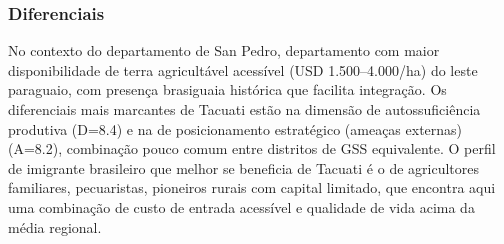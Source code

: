 \subsubsection*{Diferenciais}\label{dif-tacuati-0210}
No contexto do departamento de San Pedro, departamento com maior disponibilidade de terra agricultável acessível (USD 1.500–4.000/ha) do leste paraguaio, com presença brasiguaia histórica que facilita integração. Os diferenciais mais marcantes de Tacuati estão na dimensão de autossuficiência produtiva (D=8.4) e na de posicionamento estratégico (ameaças externas) (A=8.2), combinação pouco comum entre distritos de GSS equivalente. O perfil de imigrante brasileiro que melhor se beneficia de Tacuati é o de agricultores familiares, pecuaristas, pioneiros rurais com capital limitado, que encontra aqui uma combinação de custo de entrada acessível e qualidade de vida acima da média regional.
